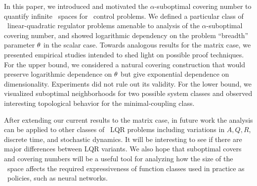 In this paper, we introduced and motivated the
$\alpha$-suboptimal covering number
to quantify infinite \envword\ spaces
for \multienv\ control problems.
We defined a particular class of \multienv\ linear-quadratic regulator problems
amenable to analysis of the $\alpha$-suboptimal covering number,
and showed logarithmic dependency on the problem ``breadth'' parameter $\theta$ in the scalar case.
Towards analogous results for the matrix case,
we presented empirical studies intended to shed light on possible proof techniques.
For the upper bound, we considered a natural covering construction that would preserve logarithmic dependence on $\theta$
but give exponential dependence on dimensionality.
Experiments did not rule out its validity.
For the lower bound, we visualized suboptimal neighborhoods for two possible system classes
and observed interesting topological behavior for the minimal-coupling class.

After extending our current results to the matrix case,
in future work the analysis can be applied to other classes of \multienv\ LQR problems
including variations in $A, Q, R$,
discrete time, and stochastic dynamics.
It will be interesting to see if there are major differences between LQR variants.
We also hope that suboptimal covers and covering numbers will be a useful tool
for analyzing how the size of the \envword\ space
affects the required expressiveness of
function classes used in practice as \multienv\ policies,
such as neural networks.
